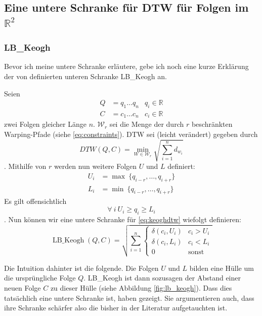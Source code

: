 \subsection{Eine untere Schranke für DTW für Folgen im \( \mathbb{R}^2 \)}

\subsubsection{LB\_Keogh}
\label{ssub:lb_keogh}

Bevor ich meine untere Schranke erläutere, gebe ich noch eine kurze Erklärung der von \citet{Keogh:2005p7751} definierten unteren Schranke LB\_Keogh an.

Seien
\begin{align}
  Q &= q_1 \dots q_n  & q_i \in \mathbb{R} \\
  C &= c_1 \dots c_n  & c_i \in \mathbb{R}
\end{align}
zwei Folgen gleicher Länge $n$. \( \mathcal{W}_r \) sei die Menge der durch \(r\) beschränkten Warping-Pfade (siehe \ref{eq:constraints}). DTW sei (leicht verändert) gegeben durch
\begin{equation}
  \label{eq:keoghdtw}
  DTW(Q,C) = \min_{W \in \mathcal{W}_r}{\sqrt{\sum_{i=1}^n d_{w_i}}}
\end{equation}.
Mithilfe von \(r\) werden nun weitere Folgen $U$ und $L$ definiert:
\begin{align}
  U_i &= \max ~\{ q_{i-r}, \dots, q_{i+r} \}\\
  L_i &= \min ~\{ q_{i-r}, \dots, q_{i+r} \}
\end{align}
Es gilt offensichtlich
\begin{equation}
  \forall ~ i ~ U_i \geq q_i \geq L_i
\end{equation}.
Nun können wir eine untere Schranke für \ref{eq:keoghdtw} wiefolgt definieren:
\begin{equation}
  \label{eq:lbkeogh}
  \operatorname{LB\_Keogh}(Q,C) = \sqrt{\sum_{i=1}^n
  \begin{cases}
    \delta(c_i, U_i) & c_i > U_i \\
    \delta(c_i, L_i) & c_i < L_i \\
    0 & \text{sonst}
  \end{cases}  
  }
\end{equation}

Die Intuition dahinter ist die folgende. Die Folgen $U$ und $L$ bilden eine Hülle um die ursprüngliche Folge $Q$. LB\_Keogh ist dann sozusagen der Abstand einer neuen Folge $C$ zu dieser Hülle (siehe Abbildung \ref{fig:lb_keogh}). Dass dies tatsächlich eine untere Schranke ist, haben \citet{Keogh:2005p7751} gezeigt. Sie argumentieren auch, dass ihre Schranke schärfer also die bisher in der Literatur aufgetauchten ist.

